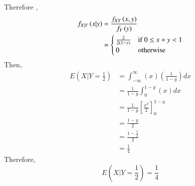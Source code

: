 \documentclass[journal,12pt,twocolumn]{IEEEtran}
\begin{document}
Therefore ,
\begin{align}
    f_{X|Y}\left(x|y\right) &= \frac{f_{XY}\left(x,y\right)}{f_Y\left(y\right)}\\
    & = 
    \begin{cases}
    \frac{2}{2(1-y)} & \text{if } 0\leq x+y < 1\\
    0 & \text{otherwise}
    \end{cases}
\end{align}
Then, 
\begin{align}
   E(X|Y= \frac{1}{2}) & =
   \int_{-\infty}^{\infty} (x)(\frac{1}{1-y})dx\\
    & = \frac{1}{1-y} \int_{0}^{1-y}(x)dx\\
    & = \frac{1}{1-y} \left[ \frac{x^2}{2} \right]_{0}^{1-y} \\
    & = \frac{1-y}{2}\\
    & = \frac{1-\frac{1}{2}}{2}\\
    & = \frac{1}{4}
\end{align}
Therefore,
$$E(X|Y= \frac{1}{2}) = \frac{1}{4}$$
\end{document}
